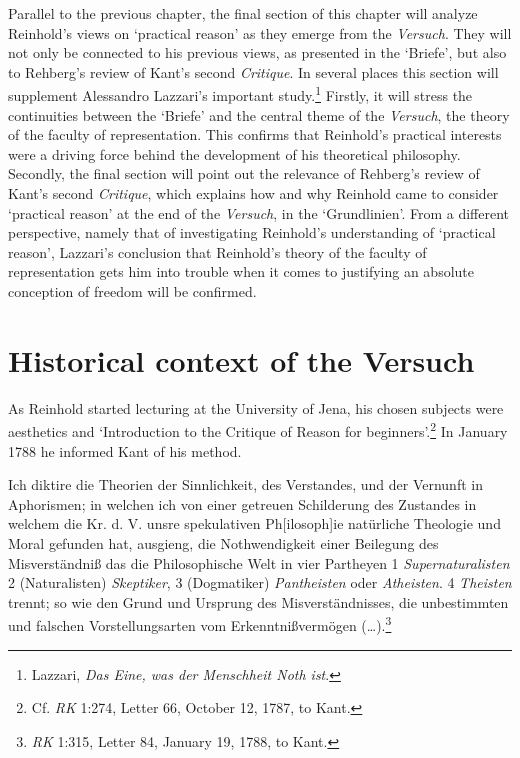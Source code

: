 Parallel to the previous chapter, the final section of this chapter will analyze Reinhold's views on `practical reason' as they emerge from the \textit{Versuch}. They will not only be connected to his previous views, as presented in the `Briefe', but also to Rehberg's review of Kant's second \textit{Critique}. In several places this section will supplement Alessandro Lazzari's important study.\footnote{ Lazzari, \textit{Das Eine, was der Menschheit Noth ist}.} Firstly, it will stress the continuities between the `Briefe' and the central theme of the \textit{Versuch}, the theory of the faculty of representation. This confirms that Reinhold's practical interests were a driving force behind the development of his theoretical philosophy. Secondly, the final section will point out the relevance of Rehberg's review of Kant's second \textit{Critique}, which explains how and why Reinhold came to consider `practical reason' at the end of the \textit{Versuch}, in the `Grundlinien'. From a different perspective, namely that of investigating Reinhold's understanding of `practical reason', Lazzari's conclusion that Reinhold's theory of the faculty of representation gets him into trouble when it comes to justifying an absolute conception of freedom will be confirmed. 


\section{Historical context of the Versuch}


As Reinhold started lecturing at the University of Jena, his chosen subjects were aesthetics and `Introduction to the Critique of Reason for beginners'.\footnote{ Cf. \textit{RK} 1:274, Letter 66, October 12, 1787, to Kant.} In January 1788 he informed Kant of his method.  

Ich diktire die Theorien der Sinnlichkeit, des Verstandes, und der Vernunft in Aphorismen; in welchen ich von einer getreuen Schilderung des Zustandes in welchem die Kr. d. V. unsre spekulativen Ph[ilosoph]ie nat\"{u}rliche Theologie und Moral gefunden hat, ausgieng, die Nothwendigkeit einer Beilegung des Misverst\"{a}ndni\ss{} das die Philosophische Welt in vier Partheyen 1 \textit{Supernaturalisten} 2 (Naturalisten) \textit{Skeptiker}, 3 (Dogmatiker) \textit{Pantheisten }oder \textit{Atheisten}. 4 \textit{Theisten} trennt; so wie den Grund und Ursprung des Misverst\"{a}ndnisses, die unbestimmten und falschen Vorstellungsarten vom Erkenntni\ss{}verm\"{o}gen (\ldots ).\footnote{ \textit{RK} 1:315, Letter 84, January 19, 1788, to Kant. } 

